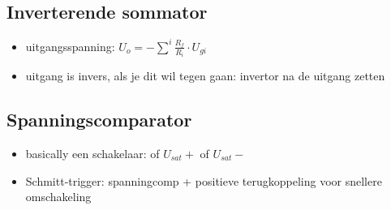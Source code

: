 \documentclass[11pt]{article}
\let\originalitem\item
\renewcommand{\item}{\originalitem[]}
\newcommand{\Newpage}{\end{preview}\begin{preview}}
\begin{document}
\begin{preview}
\Newpage
\section{Inverterende sommator}
\begin{itemize}
  \item uitgangsspanning: $ U_o = - \sum^i{\frac{R_f}{R_i}\cdot U_{gi}} $
  \item uitgang is invers, als je dit wil tegen gaan: invertor na de uitgang zetten
\end{itemize}


\Newpage
\section{Spanningscomparator}

\begin{itemize}
  \item basically een schakelaar: of $ U_{sat}+ $ of $ U_{sat}- $
  \item Schmitt-trigger: spanningcomp + positieve terugkoppeling voor snellere omschakeling
\end{itemize}


\end{preview}
\end{document}
